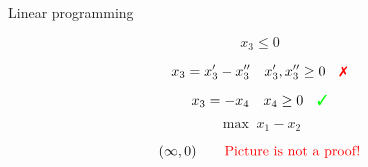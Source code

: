 \begin{frame}{Linear programming}
  \begin{exampleblock}{}
	\[
	  x_3 \le 0
	\]
  \end{exampleblock}

  \[
	x_3 = x'_3 - x''_3 \quad x'_3, x''_3 \geq 0 \quad \text{\xmark{}}
  \]

  \[
	x_3 = -x_4	\quad x_4 \geq 0	\quad \text{\cmark{}}
  \]

  \begin{exampleblock}{}
	\[
	  \max \; x_1 - x_2
	\]
  \end{exampleblock}

  \[
	(\infty, 0)	\qquad \text{\textcolor{red}{Picture is not a proof!}}
  \]
\end{frame}
